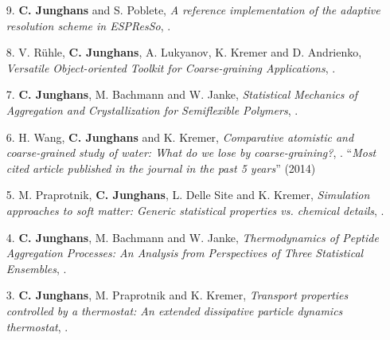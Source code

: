 \documentclass{article}
\begin{document}
\begin{enumerate}
\item[9.] \textbf{C. Junghans} and S. Poblete,
  \textit{A reference implementation of the adaptive resolution scheme in ESPResSo},
  .

\item[8.] V. R{\"u}hle, \textbf{C. Junghans}, A. Lukyanov, K. Kremer and D. Andrienko,
  \textit{Versatile Object-oriented Toolkit for Coarse-graining Applications},
  . 

\item[7.] \textbf{C. Junghans}, M. Bachmann and W. Janke,
  \textit{Statistical Mechanics of Aggregation and Crystallization for Semiflexible Polymers},
  .

\item[6.] H. Wang, \textbf{C. Junghans} and K. Kremer,
  \textit{Comparative atomistic and coarse-grained study of water: What do we lose by coarse-graining?},
  . 
  ``\emph{Most cited article published in the journal in the past 5 years}'' (2014)

\item[5.] M. Praprotnik, \textbf{C. Junghans}, L. Delle Site and K. Kremer,
  \textit{Simulation approaches to soft matter: Generic statistical properties vs. chemical details},
  .

\item[4.] \textbf{C. Junghans}, M. Bachmann and W. Janke,
  \textit{Thermodynamics of Peptide Aggregation Processes: An Analysis from Perspectives of Three Statistical Ensembles},
   .

\item[3.] \textbf{C. Junghans}, M. Praprotnik and K. Kremer,
  \textit{Transport properties controlled by a thermostat: An extended dissipative particle dynamics thermostat},
  .


\end{enumerate}
\end{document}
